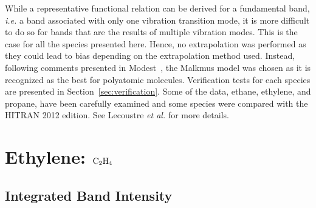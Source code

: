 While a representative functional relation can be derived for a fundamental band, \textit{i.e.} a band associated with only one vibration transition mode, it is more difficult to do so for bands that are the results of multiple vibration modes. This is the case for all the species presented here. Hence, no extrapolation was performed as they could lead to bias depending on the extrapolation method used. Instead, following comments presented in Modest~\cite{Modest2013}, the Malkmus model was chosen as it is recognized as the best for polyatomic molecules. Verification tests for each species are presented in Section~\ref{sec:verification}. Some of the data, ethane, ethylene, and propane, have been carefully examined and some species were compared with the HITRAN 2012 edition. See Lecoustre \textit{et al.} \cite{Lecoustre2014} for more details.

\clearpage

\section{Ethylene: $\rm C_2H_4$}

\subsection{Integrated Band Intensity}

